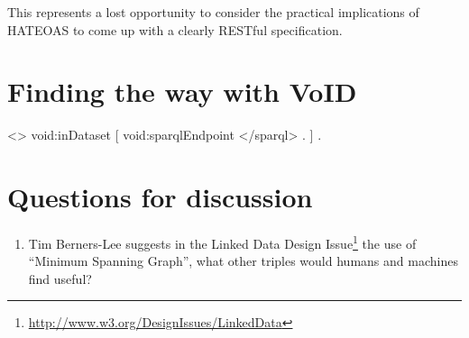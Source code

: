 \documentclass{llncs}
\begin{document}
This represents a lost opportunity to consider the practical
implications of HATEOAS to come up with a clearly RESTful specification.


\section{Finding the way with VoID}


<> void:inDataset [ void:sparqlEndpoint </sparql> . ] .


\section{Questions for discussion}

\begin{enumerate}
\item Tim Berners-Lee suggests in the Linked Data Design
  Issue\footnote{\url{http://www.w3.org/DesignIssues/LinkedData}} the
  use of ``Minimum Spanning Graph'', what other triples would humans
  and machines find useful?

\end{enumerate}



%
%

\end{document}
